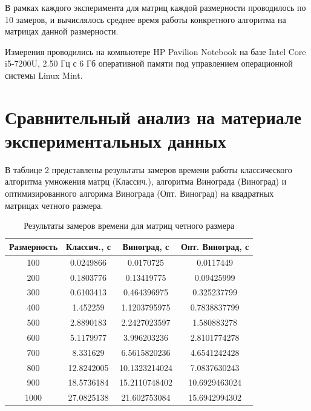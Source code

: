 \documentclass[a4paper,14pt]{report}
\begin{document}
В рамках каждого эксперимента для матриц каждой размерности проводилось по 10 замеров, и вычислялось среднее время работы конкретного алгоритма на матрицах данной размерности.

Измерения проводились на компьютере HP Pavilion Notebook на базе Intel Core i5-7200U, 2.50 Гц с 6 Гб оперативной памяти под управлением операционной системы Linux Mint.

\section*{Сравнительный анализ на материале экспериментальных данных}

В таблице 2 представлены результаты замеров времени работы классического алгоритма умножения матрц (Классич.), алгоритма Винограда (Виноград) и оптимизированного алгорима Винограда (Опт. Виноград) на квадратных матрицах четного размера.

\begin{table}
	\caption{Результаты замеров времени для матриц четного размера}
		\begin{tabular}{|c | c | c | c |}
	 	\hline
		Размерность & Классич., с & Виноград, с & Опт. Виноград, с \\ [0.5ex]
	 	\hline\hline
		100 & 0.0249866 & 0.0170725 & 0.0117449 \\ \hline
		200 & 0.1803776 & 0.13419775 & 0.09425999 \\ \hline
		300 & 0.6103413 & 0.464396975 & 0.325237799 \\ \hline
		400 & 1.452259 & 1.1203795975 & 0.7838837799 \\ \hline
		500 & 2.8890183 & 2.2427023597 & 1.580883278 \\ \hline
		600 & 5.1179977 & 3.996203236 & 2.8101774278 \\ \hline
		700 & 8.331629 & 6.5615820236 & 4.6541242428 \\ \hline
		800 & 12.8242005 & 10.1323214024 & 7.0837630243 \\ \hline
		900 & 18.5736184 & 15.2110748402 & 10.6929463024 \\ \hline
		1000 & 27.0825138 & 21.602753084 & 15.6942994302 \\ \hline
		\end{tabular}
\end{table}
\end{document}
